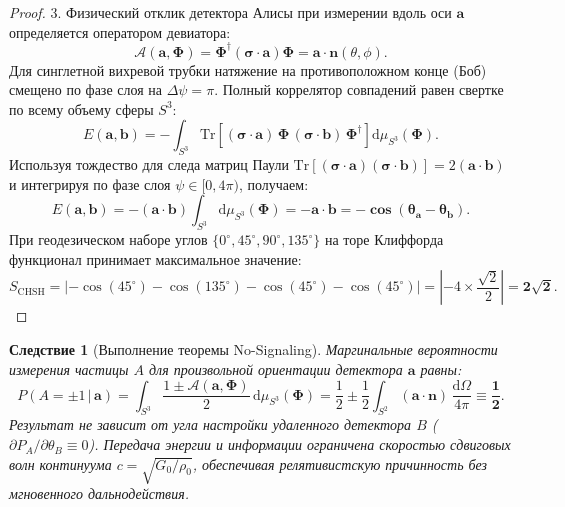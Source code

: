 \documentclass[11pt,a4paper]{article}
\newtheorem{corollary}[theorem]{Следствие}
\theoremstyle{definition}
\theoremstyle{remark}
\begin{document}
\begin{proof}
3. Физический отклик детектора Алисы при измерении вдоль оси $\mathbf{a}$ определяется оператором девиатора:
\begin{equation}
    \mathcal{A}(\mathbf{a}, \boldsymbol{\Phi}) = \boldsymbol{\Phi}^\dagger (\boldsymbol{\sigma} \cdot \mathbf{a}) \boldsymbol{\Phi} = \mathbf{a} \cdot \mathbf{n}(\theta, \phi).
\end{equation}
Для синглетной вихревой трубки натяжение на противоположном конце (Боб) смещено по фазе слоя на $\Delta \psi = \pi$. Полный коррелятор совпадений равен свертке по всему объему сферы $S^3$:
\begin{equation}
    E(\mathbf{a}, \mathbf{b}) = -\int_{S^3} \mathrm{Tr}\left[ (\boldsymbol{\sigma} \cdot \mathbf{a}) \, \boldsymbol{\Phi} \, (\boldsymbol{\sigma} \cdot \mathbf{b}) \, \boldsymbol{\Phi}^\dagger \right] \mathrm{d}\mu_{S^3}(\boldsymbol{\Phi}).
\end{equation}
Используя тождество для следа матриц Паули $\mathrm{Tr}[(\boldsymbol{\sigma}\cdot\mathbf{a})(\boldsymbol{\sigma}\cdot\mathbf{b})] = 2(\mathbf{a}\cdot\mathbf{b})$ и интегрируя по фазе слоя $\psi \in [0, 4\pi)$, получаем:
\begin{equation}
    E(\mathbf{a}, \mathbf{b}) = -(\mathbf{a} \cdot \mathbf{b}) \int_{S^3} \mathrm{d}\mu_{S^3}(\boldsymbol{\Phi}) = \mathbf{-\mathbf{a} \cdot \mathbf{b} = -\cos(\theta_a - \theta_b)}.
\end{equation}
При геодезическом наборе углов $\{0^\circ, 45^\circ, 90^\circ, 135^\circ\}$ на торе Клиффорда функционал принимает максимальное значение:
\begin{equation}
    S_{\mathrm{CHSH}} = \left| -\cos(45^\circ) - \cos(135^\circ) - \cos(45^\circ) - \cos(45^\circ) \right| = \left| -4 \times \frac{\sqrt{2}}{2} \right| = \mathbf{2\sqrt{2}}.
\end{equation}
\end{proof}

\begin{corollary}[Выполнение теоремы No-Signaling]
Маргинальные вероятности измерения частицы $A$ для произвольной ориентации детектора $\mathbf{a}$ равны:
\begin{equation}
    P(A = \pm 1 \,|\, \mathbf{a}) = \int_{S^3} \frac{1 \pm \mathcal{A}(\mathbf{a}, \boldsymbol{\Phi})}{2} \, \mathrm{d}\mu_{S^3}(\boldsymbol{\Phi}) = \frac{1}{2} \pm \frac{1}{2}\int_{S^2} (\mathbf{a} \cdot \mathbf{n}) \, \frac{\mathrm{d}\Omega}{4\pi} \equiv \boldsymbol{\frac{1}{2}}.
\end{equation}
Результат не зависит от угла настройки удаленного детектора $B$ ($\partial P_A / \partial \theta_B \equiv 0$). Передача энергии и информации ограничена скоростью сдвиговых волн континуума $c = \sqrt{G_0/\rho_0}$, обеспечивая релятивистскую причинность без мгновенного дальнодействия.
\end{corollary}
\end{document}
